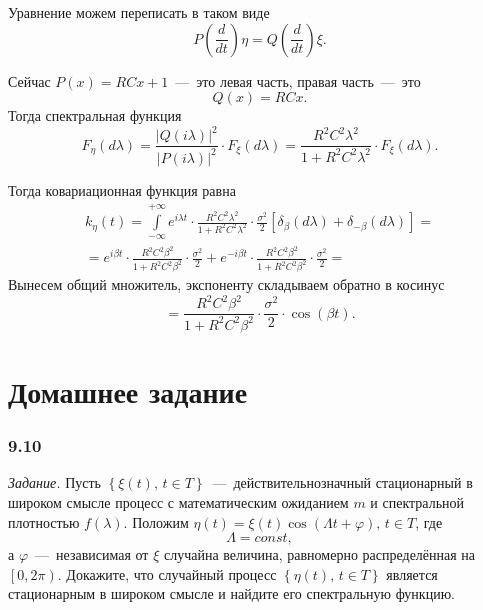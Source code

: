 Уравнение можем переписать в таком виде
\begin{equation*}
  P \left( \frac{d}{dt} \right) \eta =
  Q \left( \frac{d}{dt} \right) \xi.
\end{equation*}

Сейчас $P \left( x \right) = RCx + 1$~---~это левая часть, правая часть~---~это
\begin{equation*}
  Q \left( x \right) =
  RCx.
\end{equation*}
Тогда спектральная функция
\begin{equation*}
  F_{ \eta } \left( d \lambda \right) =
  \frac{ \left| Q \left( i \lambda \right) \right|^2}{ \left| P \left( i \lambda \right) \right|^2} \cdot
  F_{ \xi } \left( d \lambda \right) =
  \frac{R^2 C^2 \lambda^2}{1 + R^2 C^2 \lambda^2} \cdot
  F_{ \xi } \left( d \lambda \right).
\end{equation*}

Тогда ковариационная функция равна
\begin{gather*}
  k_{ \eta } \left( t \right) =
  \int \limits_{-\infty }^{+\infty }
    e^{i \lambda t} \cdot \frac{R^2 C^2 \lambda^2}{1 + R^2 C^2 \lambda^2} \cdot
    \frac{ \sigma^2}{2} \left[
      \delta_{ \beta } \left( d \lambda \right) +
      \delta_{-\beta } \left( d \lambda \right)
    \right] = \\
  = e^{i \beta t} \cdot \frac{R^2 C^2 \beta^2}{1 + R^2 C^2 \beta^2} \cdot
  \frac{ \sigma^2}{2} +
  e^{-i \beta t} \cdot \frac{R^2 C^2 \beta^2}{1 + R^2 C^2 \beta^2} \cdot
  \frac{ \sigma^2}{2} =
\end{gather*}
Вынесем общий множитель, экспоненту складываем обратно в косинус
\begin{equation*}
  = \frac{R^2 C^2 \beta^2}{1 + R^2 C^2 \beta^2} \cdot \frac{ \sigma^2}{2} \cdot
  \cos \left( \beta t \right).
\end{equation*}

\section*{Домашнее задание}

\subsubsection*{9.10}

\textit{Задание.}
Пусть $ \left\{ \xi \left( t \right), \, t \in T \right\} $~---~действительнозначный
стационарный в широком смысле процесс с математическим ожиданием $m$ и спектральной плотностью
$f \left( \lambda \right) $.
Положим
$ \eta \left( t \right) = \xi \left( t \right) \cos \left( \Lambda t + \varphi \right), \,
  t \in T$,
где
\begin{equation*}
  \Lambda =
  const,
\end{equation*}
а $\varphi$~---~независимая от $ \xi $ случайна величина,
равномерно распределённая на $ \left[ 0, 2 \pi \right) $.
Докажите, что случайный процесс $ \left\{ \eta \left( t \right), \, t \in T \right\} $
является стационарным в широком смысле и найдите его спектральную функцию.

